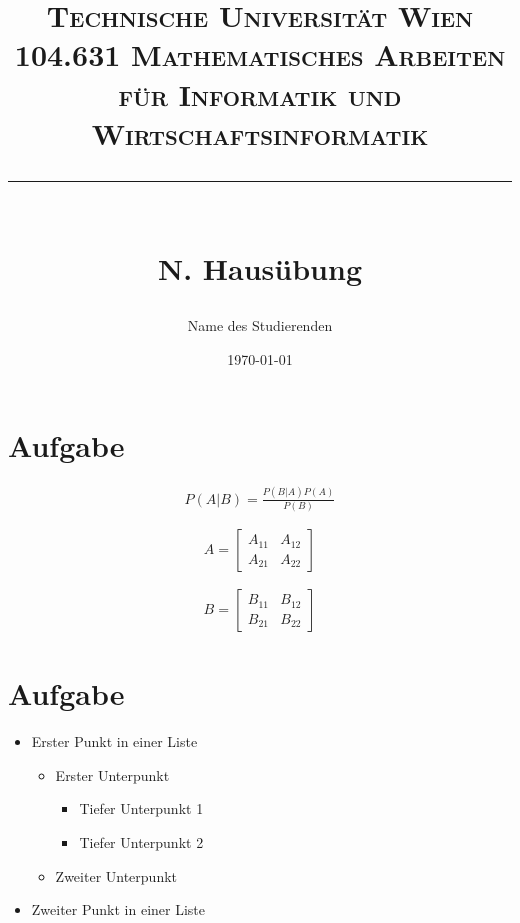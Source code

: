 \documentclass[a4paper,12pt]{article}
\title{	
	\normalfont\normalsize
	\textsc{Technische Universität Wien}\\
    \vspace{10pt}
    \textsc{\large 104.631 Mathematisches Arbeiten für Informatik und Wirtschaftsinformatik}\\
    \rule{\linewidth}{0.5pt}\\
	\vspace{20pt} 
	{\huge N. Hausübung}
}
\author{\Large Name des Studierenden} %
\date{\normalsize\today} %
\begin{document}
\maketitle %


\section{Aufgabe}



\begin{equation}
    \begin{split}
		P(A|B) = \frac{P(B|A)P(A)}{P(B)}
	\end{split}		
\end{equation} 

\begin{equation}
	A = 
	\begin{bmatrix}
		A_{11} & A_{12} \\
		A_{21} & A_{22}
	\end{bmatrix}
\end{equation}

\begin{align}
	B = 
	\begin{bmatrix}
		B_{11} & B_{12} \\
		B_{21} & B_{22}
	\end{bmatrix}
\end{align}


\section{Aufgabe}

\begin{itemize}
	\item Erster Punkt in einer Liste
		\begin{itemize}
		\item Erster Unterpunkt 
			\begin{itemize}
			\item Tiefer Unterpunkt 1
			\item Tiefer Unterpunkt 2
			\end{itemize}
		\item Zweiter Unterpunkt
		\end{itemize}
	\item Zweiter Punkt in einer Liste 
\end{itemize}
\end{document}
